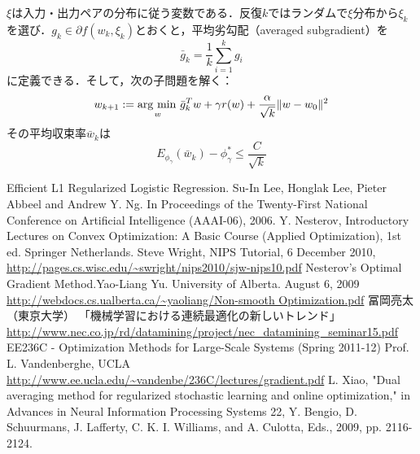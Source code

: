 \documentclass[a4paper,11pt]{jsarticle}
\numberwithin{theorem}{section}  %
\numberwithin{equation}{section} %
\newcommand{\argmin}{\mathop{\rm arg~min\,}\limits}
\begin{document}
$\xi$は入力・出力ペアの分布に従う変数である．反復$k$ではランダムで$\xi$分布から$\xi_k$を選び．$g_k \in \partial f(w_k,\xi_k)$とおくと，平均劣勾配（averaged subgradient）を
\begin{equation}
\bar{g}_k = \frac{1}{k}\sum_{i=1}^k g_i
\end{equation}
に定義できる．そして，次の子問題を解く：
\begin{equation}
w_{k+1} := \argmin_{w} \bar{g}_k^T w + \gamma r(w) + \frac{\alpha}{\sqrt{k}}\|w - w_0\|^2
\end{equation}
その平均収束率$\bar{w}_k$は
\begin{equation}
E_{\phi_\gamma}(\bar{w}_k) - \phi_\gamma^* \le \frac{C}{\sqrt{k}}
\end{equation}
\begin{thebibliography}{99}
 Efficient L1 Regularized Logistic Regression. Su-In Lee, Honglak Lee, Pieter Abbeel and Andrew Y. Ng. In Proceedings of the Twenty-First National Conference on Artificial Intelligence (AAAI-06), 2006.
 Y. Nesterov, Introductory Lectures on Convex Optimization: A Basic Course (Applied Optimization), 1st ed.    Springer Netherlands.
 Steve Wright, NIPS Tutorial, 6 December 2010,\,\,\url{ http://pages.cs.wisc.edu/~swright/nips2010/sjw-nips10.pdf}
 Nesterov's Optimal Gradient Method.Yao-Liang Yu. University of Alberta. August 6, 2009 \url{http://webdocs.cs.ualberta.ca/~yaoliang/Non-smooth Optimization.pdf}
 冨岡亮太（東京大学） 「機械学習における連続最適化の新しいトレンド」 \url{http://www.nec.co.jp/rd/datamining/project/nec_datamining_seminar15.pdf}
 EE236C - Optimization Methods for Large-Scale Systems (Spring 2011-12)
Prof. L. Vandenberghe, UCLA
 \url{http://www.ee.ucla.edu/~vandenbe/236C/lectures/gradient.pdf}
 L. Xiao, "Dual averaging method for regularized stochastic learning and online optimization," in Advances in Neural Information Processing Systems 22, Y. Bengio, D. Schuurmans, J. Lafferty, C. K. I. Williams, and A. Culotta, Eds., 2009, pp. 2116-2124.
\end{thebibliography}
\end{document}
